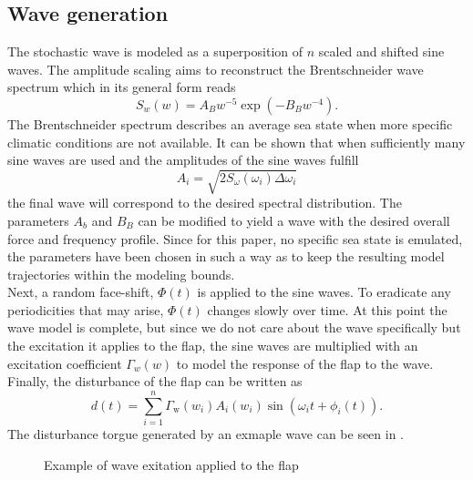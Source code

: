 \subsection{Wave generation}
The stochastic wave is modeled as a superposition of $n$ scaled and shifted sine waves. The amplitude scaling aims to reconstruct the Brentschneider wave spectrum which in its general form reads
\begin{equation}
S_w(w)=A_B w^{-5} \exp \left(-B_B w^{-4}\right).
\end{equation}
The Brentschneider spectrum describes an average sea state when more specific climatic conditions are not available. 
It can be shown that when sufficiently many sine waves are used and the amplitudes of the sine waves fulfill
\begin{equation}
A_i=\sqrt{2 S_\omega\left(\omega_i\right) \Delta \omega_i}
\end{equation}
the final wave will correspond to the desired spectral distribution.
The parameters $A_b$ and $B_B$ can be modified to yield a wave with the desired overall force and frequency profile. Since for this paper, no specific sea state is emulated, the parameters have been chosen in such a way as to keep the resulting model trajectories within the modeling bounds.\\
Next, a random face-shift, $\Phi(t)$ is applied to the sine waves. 
To eradicate any periodicities that may arise, $\Phi(t)$ changes slowly over time. At this point the wave model is complete, but since we do not care about the wave specifically but the excitation it applies to the flap, the sine waves are multiplied with an excitation coefficient $\Gamma_w(w)$ to model the response of the flap to the wave. 
Finally, the disturbance of the flap can be written as 
\begin{equation}
    d(t)=\sum_{i = 1}^{n} \Gamma_{\mathrm{w}}(w_i) A_i(w_i) \sin \left(\omega_i t+\phi_i(t)\right).
\end{equation}
The disturbance torgue generated by an exmaple wave can be seen in .
\begin{figure}[htb]
	\centering
	\fontsize{8}{0}\selectfont
	\def\svgwidth{0.49\textwidth}
	
	\caption{Example of wave exitation applied to the flap}
	\label{fig:ExampleWave}
\end{figure}

